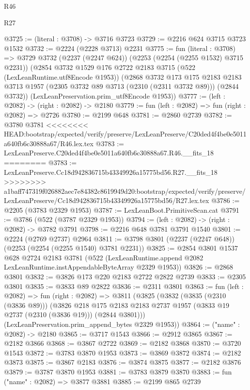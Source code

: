 \begin{lexlean}{R46}
\begin{lexlean}{R27}
\begin{coremodule}
{{{{{{{{{{{{{{{{{{{{{{{{{{{{{{{{{{{{{{{{{{{{{{{{{{{{{{{{{{{{{{@3725 := (literal : @3708) -> @3716 @3723
@3729 := @2216 @624 @3715 @3723 @1532
@3732 := @2224 (@2228 @3713) @2231
@3775 := fun (literal : @3708) =>
  @3729
    @3732
    (@2237 (@2247 @624))
    (@2253 (@2254 (@2255 @1532) @3715 @2231))
    (@2854
      @3732
      @1529
      @176
      @2722
      @2183
      @3715
      (@522 (LexLeanRuntime.utf8Encode @1953))
      (@2868
        @3732
        @173
        @175
        @2183
        @2183
        @3713
        @1957
        (@2305 @3732 @89 @3713 (@2310 (@2311 @3732 @89)))
        (@2844 @3732))
      (LexLeanPreservation.prim_utf8Encode @1953))
@3777 := (left : @2082) -> (right : @2082) -> @2180
@3779 := fun (left : @2082) => fun (right : @2082) => @2726
@3780 := @2199 @648
@3781 := @2860 @2739
@3782 := @3780 @3781
<<<<<<<< HEAD:bootstrap/expected/verify/preserve/LexLeanPreserve/C20ded4f4be0e5011a640fb6c30888a67/R46.lex.tex
@3783 := LexLeanPreserve.C20ded4f4be0e5011a640fb6c30888a67.R46.__fits_18
========
@3783 := LexLeanPreserve.Cc18d942836715b43349926a15775bd56.R27.__fits_18
>>>>>>>> a1baff747319f026882aec7e84382c8619949d20:bootstrap/expected/verify/preserve/LexLeanPreserve/Cc18d942836715b43349926a15775bd56/R27.lex.tex
@3786 := @2205 (@3783 @2329 @1953)
@3787 := LexLeanBoot.PrimitiveScan.cat
@3791 := @3786 (@522 (@3787 @2329 @1953))
@3794 := (left : @2082) -> (right : @2082) -> @3782 @3791
@3798 := @2216 @648 @3781 @3791 @1540
@3801 := @2224 (@2769 @2737) @2964
@3811 := @3798 @3801 (@2237 (@2247 @648)) (@2253 (@2254 (@2255 @1540) @3781 @2231))
@3825 := @2854
    @3801
    @1537
    @628
    @2724
    @2183
    @3781
    (@522 (LexLeanRuntime.append @2082 LexLeanRuntime.instAppendableByteArray @2329 @1953))
@3826 := @2868 @3801
@3832 := @3826 @173 @220 @2183 @2722 @2822 @2739
@3833 := @2305 @3801
@3835 := @3833 @89 @2822
@3836 := @2311 @3801
@3863 := fun (left : @2082) =>
  fun (right : @2082) =>
  @3811
    (@3825
      (@3832
        (@3835 (@2310 (@3836 @89)))
        (@3826
          @218
          @175
          @2183
          @2183
          @2737
          @1957
          (@3833 @19 @2737 (@2310 (@3836 @19)))
          (@2844 @3801)))
      (LexLeanPreservation.prim_append_bytes @2329 @1953))
@3864 := ("name" : @2082) -> @2180
@3865 := @3717 @1543
@3866 := @2912 @3865
@3867 := @2182 @3866
@3868 := @3867 @2722
@3869 := @2182 @3868
@3870 := @3720 @1543
@3872 := @3783 @3870 @1953
@3873 := @3869 @3872
@3874 := @2182 @3873
@3875 := @3867 @2183
@3876 := @3874 @3875
@3877 := @2182 @3876
@3879 := @3787 @3870 @1953
@3881 := @3783 @3879 @3870
@3883 := fun ("name" : @2082) => @3877 @3881
@3885 := @2199 @865 @2739
}}}}}}}}}}}}}}}}}}}}}}}}}}}}}}}}}}}}}}}}}}}}}}}}}}}}}}}}}}}}}}
\end{coremodule}
\end{lexlean}
\end{lexlean}
